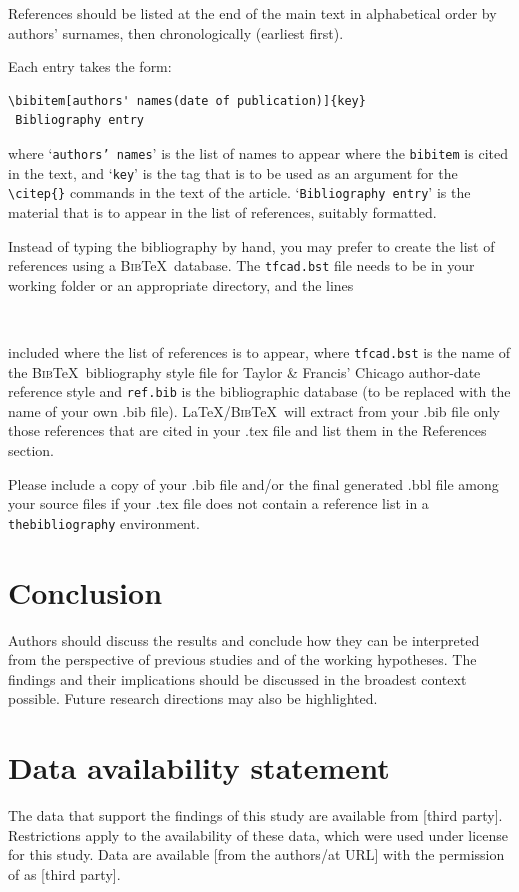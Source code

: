 \documentclass[12pt]{gsis}  %
\begin{document}
References should be listed at the end of the main text in alphabetical order by authors' surnames, then chronologically (earliest first).

Each entry takes the form:
\begin{verbatim}
\bibitem[authors' names(date of publication)]{key}
 Bibliography entry
\end{verbatim}
where `\texttt{authors' names}' is the list of names to appear where the \verb"bibitem" is cited in the text, and `\texttt{key}' is the tag that is to be used as an argument for the \verb"\citep{}" commands in the text of the article. `\texttt{Bibliography entry}' is the material that is to appear in the list of references, suitably formatted. 

Instead of typing the bibliography by hand, you may prefer to create the list of references using a \textsc{Bib}\TeX\ database. The \texttt{tfcad.bst} file needs to be in your working folder or an appropriate directory, and the lines
\begin{verbatim}


\end{verbatim}
included where the list of references is to appear, where \texttt{tfcad.bst} is the name of the \textsc{Bib}\TeX\ bibliography style file for Taylor \& Francis' Chicago author-date reference style and \texttt{ref.bib} is the bibliographic database (to be replaced with the name of your own .bib file). \LaTeX/\textsc{Bib}\TeX\ will extract from your .bib file only those references that are cited in your .tex file and list them in the References section.

Please include a copy of your .bib file and/or the final generated .bbl file among your source files if your .tex file does not contain a reference list in a \texttt{thebibliography} environment.

\section{Conclusion}
Authors should discuss the results and conclude how they can be interpreted from the perspective of previous studies and of the working hypotheses. The findings and their implications should be discussed in the broadest context possible. Future research directions may also be highlighted.

\section*{Data availability statement}
The data that support the findings of this study are available from [third party]. Restrictions apply to the availability of these data, which were used under license for this study. Data are available [from the authors/at URL] with the permission of
as [third party].
\end{document}
